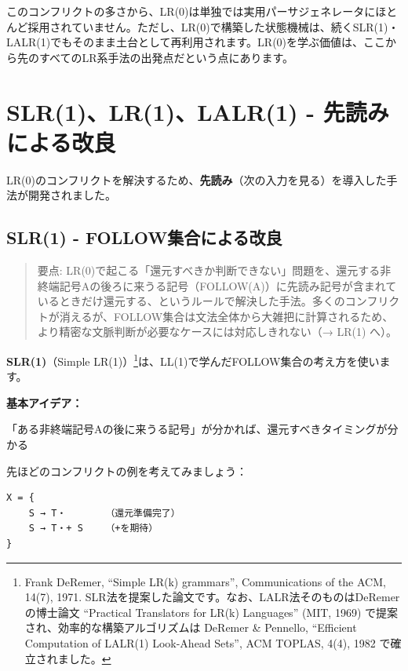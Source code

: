 このコンフリクトの多さから、LR(0)は単独では実用パーサジェネレータにほとんど採用されていません。ただし、LR(0)で構築した状態機械は、続くSLR(1)・LALR(1)でもそのまま土台として再利用されます。LR(0)を学ぶ価値は、ここから先のすべてのLR系手法の出発点だという点にあります。

\hypertarget{chapter5-slr1lr1lalr1---ux5148ux8aadux307fux306bux3088ux308bux6539ux826f}{%
\section{SLR(1)、LR(1)、LALR(1) -
先読みによる改良}\label{chapter5-slr1lr1lalr1---ux5148ux8aadux307fux306bux3088ux308bux6539ux826f}}

LR(0)のコンフリクトを解決するため、\textbf{先読み}（次の入力を見る）を導入した手法が開発されました。

\hypertarget{chapter5-slr1---followux96c6ux5408ux306bux3088ux308bux6539ux826f}{%
\subsection{SLR(1) -
FOLLOW集合による改良}\label{chapter5-slr1---followux96c6ux5408ux306bux3088ux308bux6539ux826f}}

\begin{quote}
要点:
LR(0)で起こる「還元すべきか判断できない」問題を、還元する非終端記号Aの後ろに来うる記号（FOLLOW(A)）に先読み記号が含まれているときだけ還元する、というルールで解決した手法。多くのコンフリクトが消えるが、FOLLOW集合は文法全体から大雑把に計算されるため、より精密な文脈判断が必要なケースには対応しきれない（→
LR(1) へ）。
\end{quote}

\textbf{SLR(1)}（Simple
LR(1)）\footnote{Frank DeRemer, ``Simple LR(k) grammars'',
  Communications of the ACM, 14(7), 1971.
  SLR法を提案した論文です。なお、LALR法そのものはDeRemerの博士論文
  ``Practical Translators for LR(k) Languages'' (MIT, 1969)
  で提案され、効率的な構築アルゴリズムは DeRemer \& Pennello,
  ``Efficient Computation of LALR(1) Look-Ahead Sets'', ACM TOPLAS,
  4(4), 1982 で確立されました。}は、LL(1)で学んだFOLLOW集合の考え方を使います。

\textbf{基本アイデア：}

「ある非終端記号Aの後に来うる記号」が分かれば、還元すべきタイミングが分かる

先ほどのコンフリクトの例を考えてみましょう：

\begin{verbatim}
X = {
    S → T・       （還元準備完了）
    S → T・+ S    （+を期待）
}
\end{verbatim}

